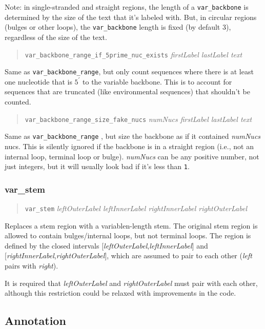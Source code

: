 \documentclass[letterpaper,12pt]{report}
\newcommand{\comment}[1]{}
\newcommand{\example}[1]{
\begin{quote}
{\raggedright
#1
}
\end{quote}
}
\begin{document}
Note: in single-stranded and straight regions, the length of a
{\tt var\_backbone} is determined by the size of the text that
it{\textquoteright}s labeled with. But, in circular regions (bulges or other loops), the
{\tt var\_backbone} length is fixed (by default 3), regardless of the size of
the text.

\example{{\tt var\_backbone\_range\_if\_5prime\_nuc\_exists}  \textit{firstLabel 
lastLabel text}}

Same as {\tt var\_backbone\_range}, but only count sequences where there is at
least one nucleotide that is $5^\prime$ to the variable backbone.  This
is to account for sequences that are truncated (like environmental
sequences) that shouldn{\textquoteright}t be counted.

\example{{\tt var\_backbone\_range\_size\_fake\_nucs}  \textit{numNucs  firstLabel 
lastLabel text}}

Same as {\tt var\_backbone\_range} , but size the backbone as if it contained
\textit{numNucs} nucs.  This is silently ignored if the backbone is in
a straight region (i.e., not an internal loop, terminal loop or bulge).  {\it numNucs} can be any positive number, not just integers, but it will usually look bad if it's less than {\tt 1}.

\comment{
DEBUGGING R2R: there{\textquoteright}s an {\tt \#if 0} directive in the C++ code that
handles these; change it to a {\tt 1}.
}

\subsubsection{var\_stem}
\example{{\tt var\_stem}  \textit{leftOuterLabel  leftInnerLabel  rightInnerLabel 
rightOuterLabel}}

Replaces a stem region with a variablen-length stem.  The original stem
region is allowed to contain bulges/internal loops, but not terminal
loops.  The region is defined by the closed intervals
[\textit{leftOuterLabel},\textit{leftInnerLabel}] and
[\textit{rightInnerLabel},\textit{rightOuterLabel}], which are assumed
to pair to each other (\textit{left} pairs with \textit{right}).

It is required that \textit{leftOuterLabel }and \textit{rightOuterLabel
}must pair with each other, although this restriction could be relaxed
with improvements in the code.

\subsection{Annotation}
\end{document}
